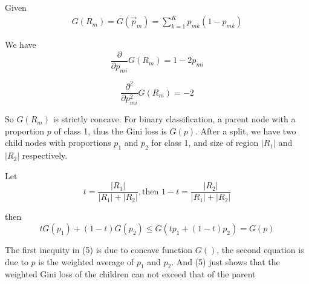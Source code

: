 \begin{answer}

Given 
\begin{align*}
    G(R_m) = G(\vec{p}_m) = \sum_{k=1}^K p_{mk} (1 - p_{mk})
\end{align*}

We have 
\begin{equation}
    \frac{\partial}{\partial p_{mi}} G(R_m)= 1 - 2p_{mi}
\end{equation}

\begin{equation}
    \frac{\partial ^2}{\partial p_{mi}^2} G(R_m)= -2
\end{equation}

So $G(R_m)$ is strictly concave. For binary classification, a parent node with a proportion $p$ of class 1, thus the Gini loss is $G(p)$. After a split, we have two child nodes with proportions $p_1$ and $p_2$ for class 1, and size of region $\lvert R_1 \rvert$ and $\lvert R_2 \rvert$ respectively. 

Let 
\begin{equation}
    t = \frac{\lvert R_1 \rvert}{\lvert R_1 \rvert + \lvert R_2 \rvert}, \text{then 
 } 1- t = \frac{\lvert R_2 \rvert}{\lvert R_1 \rvert + \lvert R_2 \rvert}
\end{equation}

then 
\begin{equation}
t G(p_1) + (1-t) G(p_2) \le G(tp_1 + (1-t)p_2) = G(p)
\end{equation}

The first inequity in (5) is due to concave function $G()$, the second equation is due to $p$ is the weighted average of $p_1$ and $p_2$. And (5) just shows that the weighted Gini loss of the children can not exceed that of the parent
\end{answer}